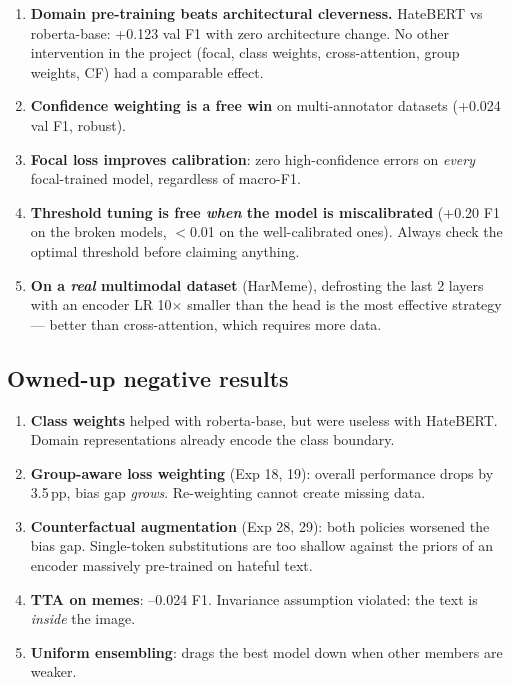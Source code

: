 \documentclass[11pt,a4paper]{article}
\begin{document}
\begin{enumerate}[leftmargin=*]
    \item \textbf{Domain pre-training beats architectural cleverness.}
    HateBERT vs roberta-base: +0.123 val F1 with zero architecture change. No
    other intervention in the project (focal, class weights, cross-attention,
    group weights, CF) had a comparable effect.
    \item \textbf{Confidence weighting is a free win} on multi-annotator datasets
    (+0.024 val F1, robust).
    \item \textbf{Focal loss improves calibration}: zero high-confidence errors on
    \emph{every} focal-trained model, regardless of macro-F1.
    \item \textbf{Threshold tuning is free \emph{when} the model is miscalibrated}
    (+0.20 F1 on the broken models, $<$0.01 on the well-calibrated ones). Always
    check the optimal threshold before claiming anything.
    \item \textbf{On a \emph{real} multimodal dataset} (HarMeme), defrosting the
    last 2 layers with an encoder LR 10$\times$ smaller than the head is the most
    effective strategy --- better than cross-attention, which requires more data.
\end{enumerate}

\subsection{Owned-up negative results}

\begin{enumerate}[leftmargin=*]
    \item \textbf{Class weights} helped with roberta-base, but were useless with
    HateBERT. Domain representations already encode the class boundary.
    \item \textbf{Group-aware loss weighting} (Exp 18, 19): overall performance
    drops by 3.5\,pp, bias gap \emph{grows}. Re-weighting cannot create missing
    data.
    \item \textbf{Counterfactual augmentation} (Exp 28, 29): both policies
    worsened the bias gap. Single-token substitutions are too shallow against the
    priors of an encoder massively pre-trained on hateful text.
    \item \textbf{TTA on memes}: --0.024 F1. Invariance assumption violated:
    the text is \emph{inside} the image.
    \item \textbf{Uniform ensembling}: drags the best model down when other
    members are weaker.
\end{enumerate}
\end{document}
